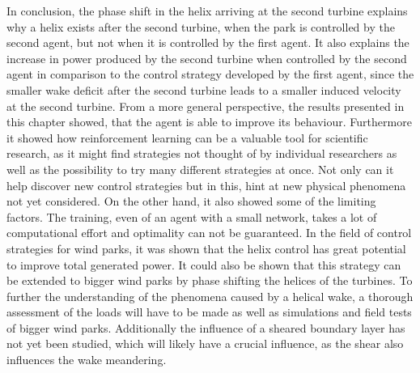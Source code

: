 In conclusion, the phase shift in the helix arriving at the second turbine explains why a helix exists after the second turbine, when the park is controlled by the second agent, but not when it is controlled by the first agent. It also explains the increase in power produced by the second turbine when controlled by the second agent in comparison to the control strategy developed by the first agent, since the smaller wake deficit after the second turbine leads to a smaller induced velocity at the second turbine. From a more general perspective, the results presented in this chapter showed, that the agent is able to improve its behaviour. Furthermore it showed how reinforcement learning can be a valuable tool for scientific research, as it might find strategies not thought of by individual researchers as well as the possibility to try many different strategies at once. Not only can it help discover new control strategies but in this, hint at new physical phenomena not yet considered. On the other hand, it also showed some of the limiting factors. The training, even of an agent with a small network, takes a lot of computational effort and optimality can not be guaranteed. In the field of control strategies for wind parks, it was shown that the helix control has great potential to improve total generated power. It could also be shown that this strategy can be extended to bigger wind parks by phase shifting the helices of the turbines. To further the understanding of the phenomena caused by a helical wake, a thorough assessment of the loads will have to be made as well as simulations and field tests of bigger wind parks. Additionally the influence of a sheared boundary layer has not yet been studied, which will likely have a crucial influence, as the shear also influences the wake meandering.